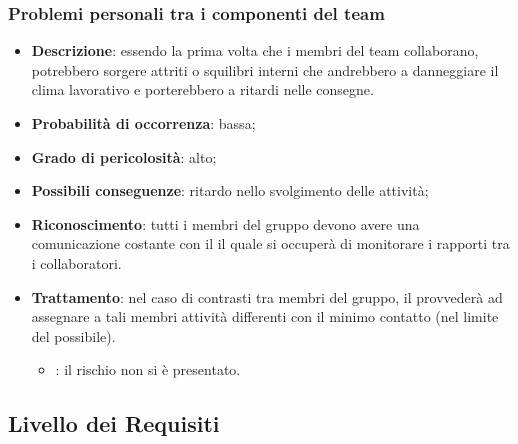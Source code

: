\documentclass[PianoDiProgetto.tex]{subfiles}
\begin{document}
		\subsubsection{Problemi personali tra i componenti del team}
			\label{sec:pptc}
\begin{itemize}
		\item \textbf{Descrizione}: essendo la prima volta che i membri del team collaborano, potrebbero sorgere attriti o squilibri interni che andrebbero a danneggiare il clima lavorativo e porterebbero a ritardi nelle consegne.
		\item \textbf{Probabilità di occorrenza}: bassa;
		\item \textbf{Grado di pericolosità}: alto;
		\item \textbf{Possibili conseguenze}: ritardo nello svolgimento delle attività;
		\item \textbf{Riconoscimento}: tutti i membri del gruppo devono avere una comunicazione costante con il \RESP{} il quale si occuperà di monitorare i rapporti tra i collaboratori.
		\item \textbf{Trattamento}: nel caso di contrasti tra membri del gruppo, il \RESP{} provvederà ad assegnare a tali membri attività differenti con il minimo contatto (nel limite del possibile).
		\begin{itemize}
				\item \PerAR : il rischio non si è presentato.
		\end{itemize}
	\end{itemize}
	
	\subsection{Livello dei Requisiti}
\end{document}
